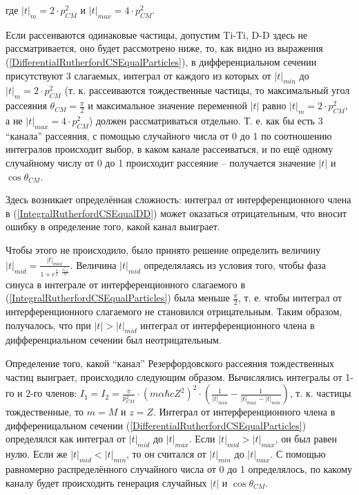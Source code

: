 \documentclass[a4paper,12pt]{article}
\begin{document}
\begin{large}
	где $|t|_{m}=2\cdot p^2_{CM}$ и $|t|_{max}=4\cdot p^2_{CM}$.
	
	Если рассеиваются одинаковые частицы, допустим Ti-Ti, D-D здесь не рассматривается, оно будет рассмотрено ниже, то, как видно из выражения (\ref{DifferentialRutherfordCSEqualParticles}), в дифференциальном сечении присутствуют 3 слагаемых, интеграл от каждого из которых от $|t|_{min}$ до $|t|_m=2\cdot p^2_{CM}$ (т. к. рассеиваются тождественные частицы, то максимальный угол рассеяния $\theta_{CM}=\frac{\pi}{2}$ и максимальное значение переменной $|t|$ равно $|t|_m=2\cdot p^2_{CM}$, а не $|t|_{max}=4\cdot p^2_{CM}$) должен рассматриваться отдельно.
	Т. е. как бы есть 3 ``канала'' рассеяния, с помощью случайного числа от 0 до 1 по соотношению интегралов происходит выбор, в каком канале рассеиваться, и по ещё одному случайному числу от 0 до 1 происходит рассеяние -- получается значение $|t|$ и $\cos{\theta_{CM}}$.
	
	Здесь возникает определённая сложность: интеграл от интерференционного члена в (\ref{IntegralRutherfordCSEqualDD}) может оказаться отрицательным, что вносит ошибку в определение того, какой канал выиграет.
	
	Чтобы этого не происходило, было принято решение определить величину $|t|_{mid}=\frac{|t|_{max}}{1+e^{\frac{\pi}{2} \cdot \frac{\beta^r_{CM}}{\alpha}}}$.
	Величина $|t|_{mid}$ определялаясь из условия того, чтобы фаза синуса в интеграле от интерференционного слагаемого в (\ref{IntegralRutherfordCSEqualParticles}) была меньше $\frac{\pi}{2}$, т. е. чтобы интеграл от интерференционного слагаемого не становился отрицательным.
	Таким образом, получалось, что при $|t| > |t|_{mid}$ интеграл от интерференционного члена в дифференциальном сечении был неотрицательным.
	
	Определение того, какой ``канал'' Резерфордовского рассеяния тождественных частиц выиграет, происходило следующим образом.
	Вычислялись интегралы от 1-го и 2-го членов: $I_1=I_2=\frac{\pi}{p^2_{CM}} \cdot \left( m \alpha \hbar c Z^2 \right)^2 \cdot \left( \frac{1}{|t|_{min}} - \frac{1}{|t|_{max}-|t|_{min}} \right)$, т. к. частицы тождественные, то $m=M$ и $z=Z$.
	Интеграл от интерференционного члена в дифференицальном сечении (\ref{DifferentialRutherfordCSEqualParticles}) определялся как интеграл от $|t|_{mid}$ до $|t|_{max}$.
	Если $|t|_{mid} > |t|_{max}$, он был равен нулю.
	Если же $|t|_{mid} < |t|_{min}$, то он считался от $|t|_{min}$ до $|t|_{max}$.
	С помощью равномерно распределённого случайного числа от 0 до 1 определялось, по какому каналу будет происходить генерация случайных $|t|$ и $\cos{\theta_{CM}}$.
	

\end{large}
\end{document}
